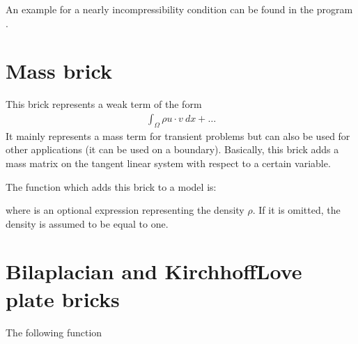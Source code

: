 \documentclass[a4paper,11pt,english]{sphinxmanual}
\begin{document}
An example for a nearly incompressibility condition can be found in the program
.

\ignorespaces 

\section{Mass brick}
\label{\detokenize{userdoc/model_mass:mass-brick}}\label{\detokenize{userdoc/model_mass:ud-model-mass}}\label{\detokenize{userdoc/model_mass:index-0}}\label{\detokenize{userdoc/model_mass::doc}}
This brick represents a weak term of the form
\begin{equation*}
\begin{split}\int_{\Omega} \rho u\cdot v\ dx + \ldots\end{split}
\end{equation*}
It mainly represents a mass term for transient problems but can also be used for
other applications (it can be used on a boundary). Basically, this brick adds a
mass matrix on the tangent linear system with respect to a certain variable.

The function which adds this brick to a model is:

\begin{sphinxVerbatim}[commandchars=\\\{\}]
  
                  
\end{sphinxVerbatim}

where  is an optional expression representing the density
\(\rho\). If it is omitted, the density is assumed to be equal to one.

\ignorespaces 

\section{Bilaplacian and Kirchhoff\sphinxhyphen{}Love plate bricks}
\label{\detokenize{userdoc/model_bilaplacian:bilaplacian-and-kirchhoff-love-plate-bricks}}\label{\detokenize{userdoc/model_bilaplacian:ud-model-bilaplacian}}\label{\detokenize{userdoc/model_bilaplacian:index-0}}\label{\detokenize{userdoc/model_bilaplacian::doc}}
The following function
\end{document}
